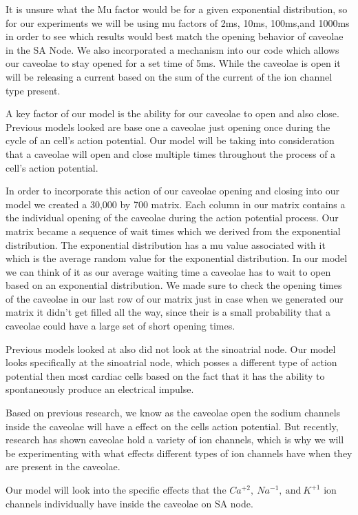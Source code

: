 \documentclass{bmcart}%
\begin{document}
It is unsure what the Mu factor would be for a given exponential distribution, so for our experiments we will be using mu factors of 2ms, 10ms, 100ms,and 1000ms in order to see which results would best match the opening behavior of caveolae in the SA Node. We also incorporated a mechanism into our code which allows our caveolae to stay opened for a set time of 5ms. While the caveolae is open it will be releasing a current based on the sum of the current of the ion channel type present.

A key factor of our model is the ability for our caveolae to open and also close. Previous models looked are base one a caveolae just opening once during the cycle of an cell's action potential. Our model will be taking into consideration that a caveolae will open and close multiple times throughout the process of a cell's action potential. 

In order to incorporate this action of our caveolae opening and closing into our model we created a 30,000 by 700 matrix. Each column in our matrix contains a the individual opening of the caveolae during the action potential process. Our matrix became a sequence of wait times which we derived from the exponential distribution. The exponential distribution has a mu value associated with it which is the average random value for the exponential distribution. In our model we can think of it as our average waiting time a caveolae has to wait to open based on an exponential distribution. We made sure to check the opening times of the caveolae in our last row of our matrix just in case when we generated our matrix it didn't get filled all the way, since their is a small probability that a caveolae could have a large set of short opening times\cite{Zhu2015}.

Previous models looked at also did not look at the sinoatrial node. Our model looks specifically at the sinoatrial node, which posses a different type of action potential then most cardiac cells based on the fact that it has the ability to spontaneously produce an electrical impulse.

Based on previous research, we know as the caveolae open the sodium channels inside the caveolae will have a effect on the cells action potential\cite{Besse2007}. But recently, research has shown caveolae hold a variety of ion channels, which is why we will be experimenting with what effects different types of ion channels have when they are present in the caveolae.

Our model will look into the specific effects that the \begin{math} Ca^{+2}, \: Na^ {-1}, \: \textrm{and} \: K^{+1} \end{math} ion channels individually have inside the caveolae on SA node. 
\end{document}
